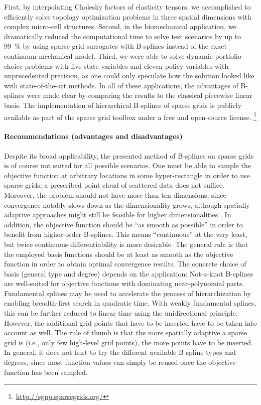 First, by interpolating Cholesky factors of elasticity tensors,
we accomplished to efficiently solve
topology optimization problems in three spatial dimensions
with complex micro-cell structures.
Second, in the biomechanical application,
we dramatically reduced the computational time to solve
test scenarios by up to \SI{99}{\percent} by using
sparse grid surrogates with B-splines instead of the
exact continuum-mechanical model.
Third, we were able to solve dynamic portfolio choice problems
with five state variables and eleven policy variables
with unprecedented precision, as one could only speculate
how the solution looked like with state-of-the-art methods.
In all of these applications, the advantages of B-splines were made clear
by comparing the results to the classical piecewise linear basis.
The implementation of hierarchical B-splines of sparse grids is
publicly available as part of the sparse grid toolbox \sgpp
under a free and open-source license.%
\footnote{%
  \url{http://sgpp.sparsegrids.org/}%
}

\vspace*{\fill}
\pagebreak

\paragraph{Recommendations (advantages and disadvantages)}

Despite its broad applicability,
the presented method of B-splines on sparse grids is of course
not suited for all possible scenarios.
One must be able to sample the objective function at arbitrary
locations in some hyper-rectangle in order to use sparse grids;
a prescribed point cloud of scattered data does not suffice.
Moreover, the problem should not have more than ten dimensions,
since convergence notably slows down as the dimensionality grows,
although spatially adaptive approaches might still be feasible for
higher dimensionalities \cite{Pflueger10Spatially}.
In addition, the objective function should be ``as smooth as possible''
in order to benefit from higher-order B-splines.
This means ``continuous'' at the very least,
but twice continuous differentiability is more desirable.
The general rule is that the employed basis functions should be
at least as smooth as the objective function in order to obtain
optimal convergence results.
The concrete choice of basis (general type and degree) depends
on the application:
Not-a-knot B-splines are well-suited for objective functions with
dominating near-polynomial parts.
Fundamental splines may be used to accelerate the process of
hierarchization by enabling breadth-first search in quadratic time.
With weakly fundamental splines, this can be further reduced to
linear time using the unidirectional principle.
However, the additional grid points that have to be inserted
have to be taken into account as well.
The rule of thumb is that the more spatially adaptive a sparse grid is
(i.e., only few high-level grid points),
the more points have to be inserted.
In general, it does not hurt to try the different available
B-spline types and degrees,
since most function values can simply be reused
once the objective function has been sampled.

